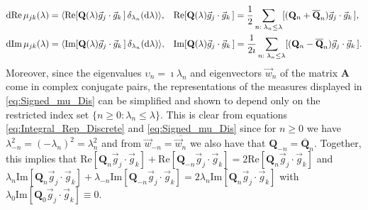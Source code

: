 \documentclass[11pt]{amsart}
\renewcommand{\d}{\mathrm{d}}
\newcommand{\Ab}{\mathbf{A}}
\newcommand{\Qb}{\mathbf{Q}}
\begin{document}
\begin{align}\label{eq:Signed_mu_Dis}
&\d\text{Re}\,\mu_{jk}(\lambda)=\langle\text{Re}[\Qb(\lambda)\vec{g}_j\cdot\vec{g}_k\,]\,\delta_{\lambda_n}(\d\lambda)\rangle,
&&
\text{Re}[\Qb(\lambda)\vec{g}_j\cdot\vec{g}_k\,]
=\frac{1}{2}\sum_{n:\;\lambda_n\leq\lambda}[(\Qb_n+\overline{\Qb}_n)\vec{g}_j\cdot\vec{g}_k\,],
% 
\\
&\d\text{Im}\,\mu_{jk}(\lambda)=\langle\text{Im}[\Qb(\lambda)\vec{g}_j\cdot\vec{g}_k\,]\,\delta_{\lambda_n}(\d\lambda)\rangle,
&&
\text{Im}[\Qb(\lambda)\vec{g}_j\cdot\vec{g}_k\,]
=\frac{1}{2\imath}\sum_{n:\;\lambda_n\leq\lambda}[(\Qb_n-\overline{\Qb}_n)\vec{g}_j\cdot\vec{g}_k\,].
%
\notag
\end{align}
%
Moreover, since the eigenvalues $\upsilon_n=\imath\lambda_n$ and eigenvectors
$\vec{w}_n$ of the matrix $\Ab$ come in complex conjugate pairs, the
representations of the measures displayed in \eqref{eq:Signed_mu_Dis}
can be simplified and shown \cite{Pavliotis:PHD_Thesis} to depend only
on the restricted index set $\{n\geq0:\lambda_n\leq\lambda\}$. This is clear from equations
\eqref{eq:Integral_Rep_Discrete} and \eqref{eq:Signed_mu_Dis} since
for $n\geq0$ we have $\lambda_{-n}^2=(-\lambda_n)^2=\lambda_n^2$ and from
$\vec{w}_{-n}=\overline{\vec{w}_n}$ we also have that
$\Qb_{-n}=\overline{\Qb}_n$. Together, this implies that
$\text{Re}[\Qb_n\vec{g}_j\cdot\vec{g}_k]+\text{Re}[\Qb_{-n}\vec{g}_j\cdot\vec{g}_k] 
=2\text{Re}[\Qb_n\vec{g}_j\cdot\vec{g}_k]$ and
$\lambda_n\text{Im}[\Qb_n\vec{g}_j\cdot\vec{g}_k]+\lambda_{-n}\text{Im}[\Qb_{-n}\vec{g}_j\cdot\vec{g}_k]
=2\lambda_n\text{Im}[\Qb_n\vec{g}_j\cdot\vec{g}_k]$ with
$\lambda_0\text{Im}[\Qb_0\vec{g}_j\cdot\vec{g}_k]\equiv0$.
\end{document}
